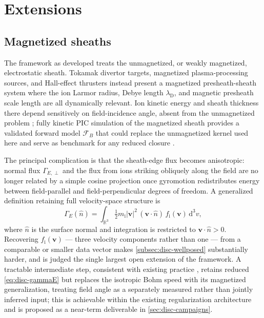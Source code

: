 \section{Extensions}
\label{sec:disc-extensions}

\subsection{Magnetized sheaths}
\label{subsec:disc-magnetized}

The framework as developed treats the unmagnetized, or weakly magnetized, electrostatic sheath. Tokamak divertor targets, magnetized plasma-processing sources, and Hall-effect thrusters instead present a magnetized presheath-sheath system where the ion Larmor radius, Debye length $\lambda_{\mathrm{D}}$, and magnetic presheath scale length are all dynamically relevant. Ion kinetic energy and sheath thickness there depend sensitively on field-incidence angle, absent from the unmagnetized problem \cite{ref0088}; fully kinetic PIC simulation of the magnetized sheath \cite{ref0633} provides a validated forward model $\mathcal{F}_{B}$ that could replace the unmagnetized kernel used here and serve as benchmark for any reduced closure \cite{ref0631,ref0633}.

The principal complication is that the sheath-edge flux becomes anisotropic: normal flux $\Gamma_{E,\perp}$ and the flux from ions striking obliquely along the field are no longer related by a simple cosine projection once gyromotion redistributes energy between field-parallel and field-perpendicular degrees of freedom. A generalized definition retaining full velocity-space structure is
\begin{equation}
\Gamma_{E}(\hat{n}) = \int_{\mathbb{R}^{3}} \tfrac{1}{2} m_{\mathrm{i}} |\mathbf{v}|^{2} \, (\mathbf{v}\cdot\hat{n}) \, f_{\mathrm{i}}(\mathbf{v}) \, \mathrm{d}^{3}v ,
\label{eq:disc-gammaE-mag}
\end{equation}
where $\hat{n}$ is the surface normal and integration is restricted to $\mathbf{v}\cdot\hat{n} > 0$. Recovering $f_{\mathrm{i}}(\mathbf{v})$ — three velocity components rather than one — from a comparable or smaller data vector makes \cref{subsec:disc-wellposed} substantially harder, and is judged the single largest open extension of the framework. A tractable intermediate step, consistent with existing practice \cite{ref0088}, retains reduced \cref{eq:disc-gammaE} but replaces the isotropic Bohm speed with its magnetized generalization, treating field angle as a separately measured rather than jointly inferred input; this is achievable within the existing regularization architecture and is proposed as a near-term deliverable in \cref{sec:disc-campaigns}.

